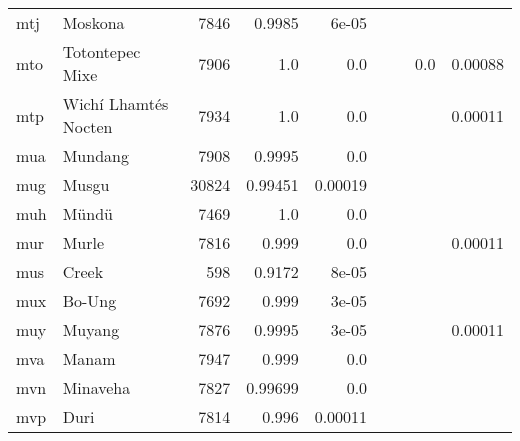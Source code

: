\documentclass[11pt]{article}
\begin{document}
\begin{table*}[h]
{\begin{tabular}{llrrrrrrr}
mtj         & Moskona         & 7846         & 0.9985         & 6e-05         &          &          &          &          \\

mto         & Totontepec Mixe         & 7906         & 1.0         & 0.0         &          &          & 0.0         & 0.00088         \\

mtp         & Wichí Lhamtés Nocten         & 7934         & 1.0         & 0.0         &          &          &          & 0.00011         \\

mua         & Mundang         & 7908         & 0.9995         & 0.0         &          &          &          &          \\

mug         & Musgu         & 30824         & 0.99451         & 0.00019         &          &          &          &          \\

muh         & Mündü         & 7469         & 1.0         & 0.0         &          &          &          &          \\

mur         & Murle         & 7816         & 0.999         & 0.0         &          &          &          & 0.00011         \\

mus         & Creek         & 598         & 0.9172         & 8e-05         &          &          &          &          \\

mux         & Bo-Ung         & 7692         & 0.999         & 3e-05         &          &          &          &          \\

muy         & Muyang         & 7876         & 0.9995         & 3e-05         &          &          &          & 0.00011         \\

mva         & Manam         & 7947         & 0.999         & 0.0         &          &          &          &          \\

mvn         & Minaveha         & 7827         & 0.99699         & 0.0         &          &          &          &          \\

mvp         & Duri         & 7814         & 0.996         & 0.00011         &          &          &          &          \\


\end{tabular}}
\end{table*}
\end{document}
